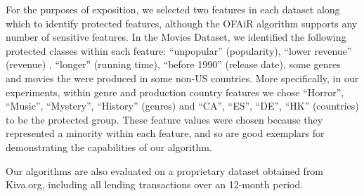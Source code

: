 For the purposes of exposition, we selected two features in each dataset along which to identify protected features, although the OFAiR algorithm supports any number of sensitive features. In the Movies Dataset, we identified the following protected classes within each feature: ``unpopular'' (popularity), ``lower revenue'' (revenue) , ``longer'' (running time), ``before 1990'' (release date), some genres and movies the were produced in some non-US countries. More specifically, in our experiments, within genre and production country features we chose ``Horror'', ``Music'', ``Mystery'', ``History'' (genres) and ``CA'', ``ES'', ``DE'', ``HK'' (countries) to be the protected group. These feature values were chosen because they represented a minority within each feature, and so are good exemplars for demonstrating the capabilities of our algorithm.

Our algorithms are also evaluated on a proprietary dataset obtained from Kiva.org, including all lending transactions over an 12-month period. 





